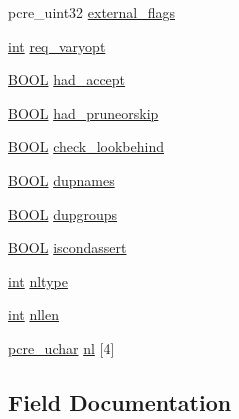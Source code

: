 \begin{DoxyCompactItemize}
\item 
pcre\+\_\+uint32 \hyperlink{structcompile__data_ab10020d1b58e0861c1be5917d20d5438}{external\+\_\+flags}
\item 
\hyperlink{pcre_8txt_a42dfa4ff673c82d8efe7144098fbc198}{int} \hyperlink{structcompile__data_a049a932bfddc5a06805071e9ca08a3cc}{req\+\_\+varyopt}
\item 
\hyperlink{pcre__internal_8h_a050c65e107f0c828f856a231f4b4e788}{B\+O\+OL} \hyperlink{structcompile__data_a7e66e09e50e8110573a3132af307f983}{had\+\_\+accept}
\item 
\hyperlink{pcre__internal_8h_a050c65e107f0c828f856a231f4b4e788}{B\+O\+OL} \hyperlink{structcompile__data_a2862f095c57a72f1e4b93d9ed10c222c}{had\+\_\+pruneorskip}
\item 
\hyperlink{pcre__internal_8h_a050c65e107f0c828f856a231f4b4e788}{B\+O\+OL} \hyperlink{structcompile__data_a995d75ad4a9071f73c05d323daff52c3}{check\+\_\+lookbehind}
\item 
\hyperlink{pcre__internal_8h_a050c65e107f0c828f856a231f4b4e788}{B\+O\+OL} \hyperlink{structcompile__data_ab6466924a95b13907bb9cf92eab9d2c5}{dupnames}
\item 
\hyperlink{pcre__internal_8h_a050c65e107f0c828f856a231f4b4e788}{B\+O\+OL} \hyperlink{structcompile__data_af06fc86ab37386fa55025c5f8585a7c4}{dupgroups}
\item 
\hyperlink{pcre__internal_8h_a050c65e107f0c828f856a231f4b4e788}{B\+O\+OL} \hyperlink{structcompile__data_a8f769a7e12713194068444a9fb68026b}{iscondassert}
\item 
\hyperlink{pcre_8txt_a42dfa4ff673c82d8efe7144098fbc198}{int} \hyperlink{structcompile__data_aacd1282193574f239ea481833837a230}{nltype}
\item 
\hyperlink{pcre_8txt_a42dfa4ff673c82d8efe7144098fbc198}{int} \hyperlink{structcompile__data_afffec692f99b0882a2f360f07a8e9a60}{nllen}
\item 
\hyperlink{pcre__internal_8h_a9d8efd0ad5b191db2a1793268600deb9}{pcre\+\_\+uchar} \hyperlink{structcompile__data_a655990757cd6b0018610713f3429d7b5}{nl} \mbox{[}4\mbox{]}
\end{DoxyCompactItemize}


\subsection{Field Documentation}
